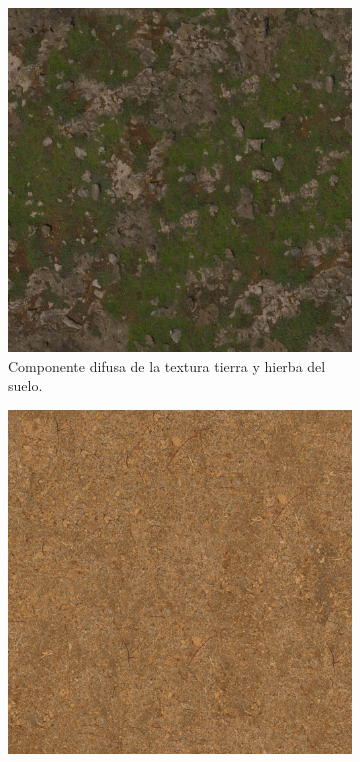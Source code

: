 \begin{figure}[H]
    \centering 
	\begin{subfigure}[t]{0.48\textwidth}
	    \centering
        \includegraphics[width=\textwidth]{imagenes/converted/coast_sand_rocks_02_diff_4k.jpg}
        \caption{Componente difusa de la textura tierra y hierba del suelo.}
        \label{fig:coastsand}
    \end{subfigure}
    \hfill 
	\begin{subfigure}[t]{0.48\textwidth}
	    \centering
        \includegraphics[width=\textwidth]{imagenes/Ground066_2K_Color.png}

\end{subfigure}
\end{figure}
